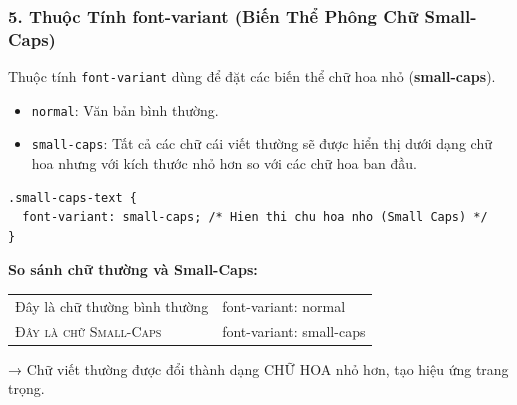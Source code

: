 \documentclass[11pt,oneside]{book}
\newcommand{\codeinline}[1]{\textcolor{accentOrange}{\texttt{#1}}}
\newcommand{\term}[1]{\textbf{\textcolor{primaryBlue}{#1}}}
\begin{document}
\subsubsection{5. Thuộc Tính font-variant (Biến Thể Phông Chữ Small-Caps)}
\label{sec:font_variant}

Thuộc tính \codeinline{font-variant} dùng để đặt các biến thể chữ hoa nhỏ (\term{small-caps}).

\begin{conceptBox}
\begin{itemize}[leftmargin=1.5em, itemsep=3pt, parsep=0pt]
    \item \codeinline{normal}: Văn bản bình thường.
    \item \codeinline{small-caps}: Tất cả các chữ cái viết thường sẽ được hiển thị dưới dạng chữ hoa nhưng với kích thước nhỏ hơn so với các chữ hoa ban đầu.
\end{itemize}
\end{conceptBox}

\begin{codeWindow}
\begin{lstlisting}[language=CSS3]
.small-caps-text {
  font-variant: small-caps; /* Hien thi chu hoa nho (Small Caps) */
}
\end{lstlisting}
\end{codeWindow}

\begin{browserWindow}
\begin{tcolorbox}[arc=4pt, colback=white, colframe=primaryBlue!30, boxrule=0.8pt, top=10pt, bottom=10pt, left=12pt, right=12pt]
  {\sffamily\bfseries\color{primaryBlue} So sánh chữ thường và Small-Caps:}\par\vspace{6pt}
  \begin{tabular}{@{}l l@{}}
    {\sffamily\fontsize{14}{18}\selectfont Đây là chữ thường bình thường} & {\sffamily\small\color{gray!70} font-variant: normal} \\ [8pt]
    {\sffamily\fontsize{14}{18}\selectfont\textsc{Đây là chữ Small-Caps}} & {\sffamily\small\color{gray!70} font-variant: small-caps} \\
  \end{tabular}\par\vspace{6pt}
  {\sffamily\small\color{gray!70} → Chữ viết thường được đổi thành dạng CHỮ HOA nhỏ hơn, tạo hiệu ứng trang trọng.}
\end{tcolorbox}
\end{browserWindow}
\end{document}
